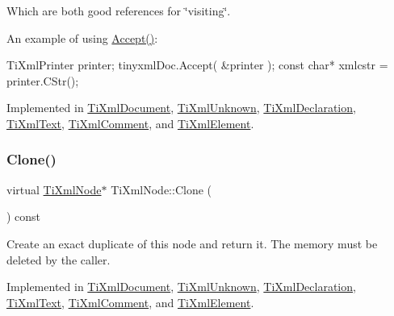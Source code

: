 Which are both good references for \char`\"{}visiting\char`\"{}.

An example of using \hyperlink{class_ti_xml_node_acc0f88b7462c6cb73809d410a4f5bb86}{Accept()}\+: \begin{DoxyVerb}TiXmlPrinter printer;
tinyxmlDoc.Accept( &printer );
const char* xmlcstr = printer.CStr();
\end{DoxyVerb}
 

Implemented in \hyperlink{class_ti_xml_document_a8ddd6eec722cbd25900bbac664909bac}{Ti\+Xml\+Document}, \hyperlink{class_ti_xml_unknown_aafdf1b2d4f561979c7907bad91004999}{Ti\+Xml\+Unknown}, \hyperlink{class_ti_xml_declaration_aa1b6bade6c989407ce9881bdfc73c1e6}{Ti\+Xml\+Declaration}, \hyperlink{class_ti_xml_text_af65964326eac4640bfb97d4622fa0de2}{Ti\+Xml\+Text}, \hyperlink{class_ti_xml_comment_ac894241530d1d266131a5026cb251a95}{Ti\+Xml\+Comment}, and \hyperlink{class_ti_xml_element_a01d33358cce9d1817b557d314dda3779}{Ti\+Xml\+Element}.

\mbox{\label{class_ti_xml_node_a4508cc3a2d7a98e96a54cc09c37a78a4}} 
\subsubsection{\texorpdfstring{Clone()}{Clone()}}
{\footnotesize\ttfamily virtual \hyperlink{class_ti_xml_node}{Ti\+Xml\+Node}$\ast$ Ti\+Xml\+Node\+::\+Clone (\begin{DoxyParamCaption}{ }\end{DoxyParamCaption}) const\hspace{0.3cm}{\ttfamily [pure virtual]}}

Create an exact duplicate of this node and return it. The memory must be deleted by the caller. 

Implemented in \hyperlink{class_ti_xml_document_a46a4dda6c56eb106d46d4046ae1e5353}{Ti\+Xml\+Document}, \hyperlink{class_ti_xml_unknown_a3dea7689de5b1931fd6657992948fde0}{Ti\+Xml\+Unknown}, \hyperlink{class_ti_xml_declaration_a35dc1455f69b79e81cae28e186944610}{Ti\+Xml\+Declaration}, \hyperlink{class_ti_xml_text_a98a20d7a4f1c1478e25e34921be24bfe}{Ti\+Xml\+Text}, \hyperlink{class_ti_xml_comment_a1f9f06e2ed3f77875093436193b16c16}{Ti\+Xml\+Comment}, and \hyperlink{class_ti_xml_element_a810ea8fa40844c01334e5af2a26794cb}{Ti\+Xml\+Element}.

\mbox{\label{class_ti_xml_node_ae98c367f664890c4b5a5183481ec128a}} 
